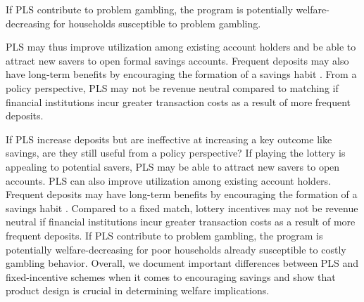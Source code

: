 \documentclass[11pt]{article}
\begin{document}
If PLS contribute to problem gambling, the program is potentially welfare-decreasing for households susceptible to problem gambling. 

PLS may thus improve utilization among existing account holders and be able to attract new savers to open formal savings accounts. Frequent deposits may also have long-term benefits by encouraging the formation of a savings habit \parencite{alessie_saving_2009}. From a policy perspective, PLS may not be revenue neutral compared to matching if financial institutions incur greater transaction costs as a result of more frequent deposits.

If PLS increase deposits but are ineffective at increasing a key outcome like savings, are they still useful from a policy perspective? If playing the lottery is appealing to potential savers, PLS may be able to attract new savers to open  accounts. PLS can also improve utilization among existing account holders. Frequent deposits may have long-term benefits by encouraging the formation of a savings habit \parencite{alessie_saving_2009}. Compared to a fixed match, lottery incentives may not be revenue neutral if financial institutions incur greater transaction costs as a result of more frequent deposits. If PLS contribute to problem gambling, the program is potentially welfare-decreasing for poor households already susceptible to costly gambling behavior. Overall, we document important differences between PLS and fixed-incentive schemes when it comes to encouraging savings and show that product design is crucial in determining welfare implications.

\end{document}
